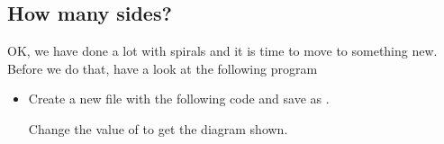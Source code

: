\documentclass{coderdojo}
\begin{document}

\subsection{How many sides?}

OK, we have done a lot with spirals and it is time to move to something new. Before we do that, have a look at the following program 
 
\begin{itemize}
\item[\todoSymbol] \color{todo}
Create a new file with the following code and save as .

Change the value of  to get the diagram shown.
\end{itemize}
\end{document}
